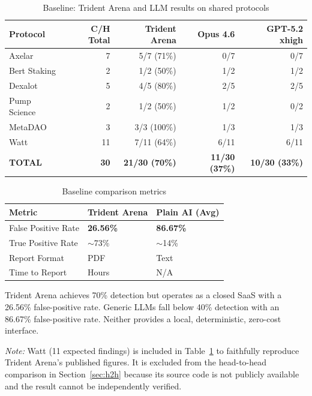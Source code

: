\documentclass{article}
\begin{document}
\begin{table}[H]
  \caption{Baseline: Trident Arena and LLM results on shared protocols}
  \label{tab:baseline}
  \centering
  \begin{tabular}{lrrrr}
    \toprule
    Protocol & C/H Total & Trident Arena & Opus 4.6 & GPT-5.2 xhigh \\
    \midrule
    Axelar & 7 & 5/7 (71\%) & 0/7 & 0/7 \\
    Bert Staking & 2 & 1/2 (50\%) & 1/2 & 1/2 \\
    Dexalot & 5 & 4/5 (80\%) & 2/5 & 2/5 \\
    Pump Science & 2 & 1/2 (50\%) & 1/2 & 0/2 \\
    MetaDAO & 3 & 3/3 (100\%) & 1/3 & 1/3 \\
    Watt & 11 & 7/11 (64\%) & 6/11 & 6/11 \\
    \textbf{TOTAL} & \textbf{30} & \textbf{21/30 (70\%)} & \textbf{11/30 (37\%)} & \textbf{10/30 (33\%)} \\
    \bottomrule
  \end{tabular}
\end{table}

\begin{table}[H]
  \caption{Baseline comparison metrics}
  \label{tab:baseline_metrics}
  \centering
  \begin{tabular}{lll}
    \toprule
    Metric & Trident Arena & Plain AI (Avg) \\
    \midrule
    False Positive Rate & \textbf{26.56\%} & \textbf{86.67\%} \\
    True Positive Rate & $\sim$73\% & $\sim$14\% \\
    Report Format & PDF & Text \\
    Time to Report & Hours & N/A \\
    \bottomrule
  \end{tabular}
\end{table}

Trident Arena achieves 70\% detection but operates as a closed SaaS with a 26.56\% false-positive rate. Generic LLMs fall below 40\% detection with an 86.67\% false-positive rate. Neither provides a local, deterministic, zero-cost interface.

\textit{Note:} Watt (11 expected findings) is included in Table~\ref{tab:baseline} to faithfully reproduce Trident Arena's published figures. It is excluded from the head-to-head comparison in Section~\ref{sec:h2h} because its source code is not publicly available and the result cannot be independently verified.
\end{document}
